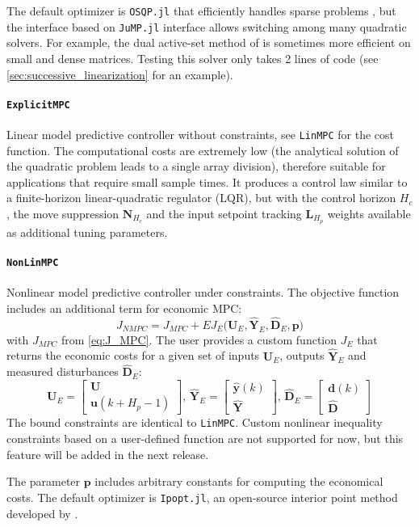 The default optimizer is \texttt{OSQP.jl} that efficiently handles sparse problems \citep{osqp}, but the interface based on \texttt{JuMP.jl} interface allows switching among many quadratic solvers. For example, the dual active-set method of \citet{daqp} is sometimes more efficient on small and dense matrices. Testing this solver only takes 2 lines of code (see \cref{sec:successive_linearization} for an example).

\paragraph{\textnormal{\texttt{ExplicitMPC}}}
Linear model predictive controller without constraints, see \texttt{LinMPC} for the cost function. The computational costs are extremely low (the analytical solution of the quadratic problem leads to a single array division), therefore suitable for applications that require small sample times. It produces a control law similar to a finite-horizon linear-quadratic regulator (LQR), but with the control horizon $H_c$, the move suppression $\mathbf{N}_{H_c}$ and the input setpoint tracking $\mathbf{L}_{H_p}$ weights available as additional tuning parameters.

\paragraph{\textnormal{\texttt{NonLinMPC}}}
Nonlinear model predictive controller under constraints. The objective function includes an additional term for economic MPC:
\begin{equation}\label{eq:J_NMPC}
J_{\mathit{NMPC}} = J_{\mathit{MPC}} 
    + E J_E\big(\mathbf{U}_E, \mathbf{\hat{Y}}_E, \mathbf{\hat{D}}_E, \mathbf{p}\big)
\end{equation}
with $J_{\mathit{MPC}}$ from \eqref{eq:J_MPC}. The user provides a custom function $J_E$ that returns the economic costs for a given set of inputs $\mathbf{U}_E$, outputs $\mathbf{\hat{Y}}_E$ and measured disturbances $\mathbf{\hat{D}}_E$:
\begin{equation}
\mathbf{U}_E = 
\begin{bmatrix}
    \mathbf{U} \\ \mathbf{u}(k+H_p-1)
\end{bmatrix}\!,\,
\mathbf{\hat{Y}}_E = 
\begin{bmatrix}
    \mathbf{\hat{y}}(k) \\ \mathbf{\hat{Y}}
\end{bmatrix}\!,\, 
\mathbf{\hat{D}}_E = 
\begin{bmatrix}
    \mathbf{d}(k) \\ \mathbf{\hat{D}}
\end{bmatrix} 
\end{equation} 
The bound constraints are identical to \texttt{LinMPC}. Custom nonlinear inequality constraints based on a user-defined function are not supported for now, but this feature will be added in the next release.

The parameter $\mathbf{p}$ includes arbitrary constants for computing the economical costs. The default optimizer is \texttt{Ipopt.jl}, an open-source interior point method developed by \citet{ipopt}.
